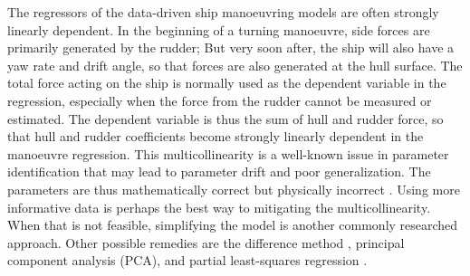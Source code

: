 %
The regressors of the data-driven ship manoeuvring models are often strongly linearly dependent. 
In the beginning of a turning manoeuvre, side forces are primarily generated by the rudder; But very soon after, the ship will also have a yaw rate and drift angle, so that forces are also generated at the hull surface. The total force acting on the ship is normally used as the dependent variable in the regression, especially when the force from the rudder cannot be measured or estimated. The dependent variable is thus the sum of hull and rudder force, so that hull and rudder coefficients become strongly linearly dependent in the manoeuvre regression.
This multicollinearity is a well-known issue in parameter identification that may lead to parameter drift and poor generalization. The parameters are thus mathematically correct but physically incorrect \citep{luo_parameter_2016-1}. 
Using more informative data is perhaps the best way to mitigating the multicollinearity. When that is not feasible, simplifying the model is another commonly researched approach. 
Other possible remedies are the difference method \citep{luo_parameter_2016-1}, principal component analysis (PCA), and partial least-squares regression \citep{jian-chuan_parametric_2015}.

